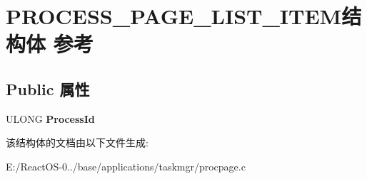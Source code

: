\hypertarget{struct_p_r_o_c_e_s_s___p_a_g_e___l_i_s_t___i_t_e_m}{}\section{P\+R\+O\+C\+E\+S\+S\+\_\+\+P\+A\+G\+E\+\_\+\+L\+I\+S\+T\+\_\+\+I\+T\+E\+M结构体 参考}
\label{struct_p_r_o_c_e_s_s___p_a_g_e___l_i_s_t___i_t_e_m}
\subsection*{Public 属性}
\begin{DoxyCompactItemize}
\item 
\mbox{\label{struct_p_r_o_c_e_s_s___p_a_g_e___l_i_s_t___i_t_e_m_abe21d191c459558846896fe1216b8573}} 
U\+L\+O\+NG {\bfseries Process\+Id}
\end{DoxyCompactItemize}


该结构体的文档由以下文件生成\+:\begin{DoxyCompactItemize}
\item 
E\+:/\+React\+O\+S-\/0../base/applications/taskmgr/procpage.\+c\end{DoxyCompactItemize}
